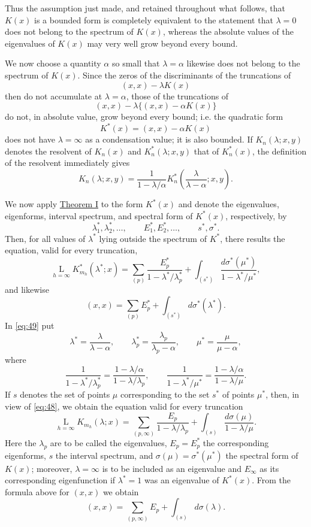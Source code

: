 \documentclass[b5paper,twoside]{article}
\newcommand{\originalpage}[1]{\phantomsection\label{origpage:#1}}
\begin{document}
Thus the assumption just made, and retained throughout what follows, that
$K(x)$ is a bounded form is completely equivalent to the statement that
$\lambda=0$ does not belong to the spectrum of $K(x)$, whereas the absolute
values of the eigenvalues of $K(x)$ may very well grow beyond every bound.

We now choose a quantity $\alpha$ so small that $\lambda=\alpha$ likewise
does not belong to the spectrum of $K(x)$.  Since the zeros of the
discriminants of the truncations of
\[
  (x,x)-\lambda K(x)
\]
then do not accumulate at $\lambda=\alpha$, those of the truncations of
\[
  (x,x)-\lambda\bigl\{(x,x)-\alpha K(x)\bigr\}
\]
do not, in absolute value, grow beyond every bound; i.e. the quadratic form
\[
  K^*(x)=(x,x)-\alpha K(x)
\]
does not have $\lambda=\infty$ as a condensation value; it is also bounded.
If $K_n(\lambda;x,y)$ denotes the resolvent of $K_n(x)$ and
$K_n^*(\lambda;x,y)$ that of $K_n^*(x)$, the definition of the resolvent
immediately gives
\begin{equation}
\tag{48}\label{eq:48}
  K_n(\lambda;x,y)
  =\frac{1}{1-\lambda/\alpha}
   K_n^*\!\left(\frac{\lambda}{\lambda-\alpha};x,y\right).
\end{equation}

We now apply \hyperref[thm:I]{Theorem I} to the form $K^*(x)$ and denote the
eigenvalues, eigenforms, interval spectrum, and spectral form of $K^*(x)$,
respectively, by
\[
  \lambda_1^*,\lambda_2^*,\ldots,
  \qquad E_1^*,E_2^*,\ldots,
  \qquad s^*,\sigma^*.
\]
Then, for all values of $\lambda^*$ lying outside the spectrum of $K^*$,
there results the equation, valid for every truncation,
\begin{equation}
\tag{49}\label{eq:49}
  \mathop{\mathrm{L}}\limits_{h=\infty}
  K_{m_h}^*(\lambda^*;x)
  =\sum_{(p)}\frac{E_p^*}{1-\lambda^*/\lambda_p^*}
   +\int_{(s^*)}\frac{d\sigma^*(\mu^*)}{1-\lambda^*/\mu^*},
\end{equation}
\originalpage{184}and likewise
\[
  (x,x)=\sum_{(p)}E_p^*+\int_{(s^*)}d\sigma^*(\lambda^*).
\]
In \eqref{eq:49} put
\[
  \lambda^*=\frac{\lambda}{\lambda-\alpha},
  \qquad
  \lambda_p^*=\frac{\lambda_p}{\lambda_p-\alpha},
  \qquad
  \mu^*=\frac{\mu}{\mu-\alpha},
\]
where
\[
  \frac{1}{1-\lambda^*/\lambda_p^*}
  =\frac{1-\lambda/\alpha}{1-\lambda/\lambda_p},
  \qquad
  \frac{1}{1-\lambda^*/\mu^*}
  =\frac{1-\lambda/\alpha}{1-\lambda/\mu}.
\]
If $s$ denotes the set of points $\mu$ corresponding to the set $s^*$ of
points $\mu^*$, then, in view of \eqref{eq:48}, we obtain the equation valid
for every truncation
\[
  \mathop{\mathrm{L}}\limits_{h=\infty}K_{m_h}(\lambda;x)
  =\sum_{(p,\infty)}\frac{E_p}{1-\lambda/\lambda_p}
   +\int_{(s)}\frac{d\sigma(\mu)}{1-\lambda/\mu}.
\]
Here the $\lambda_p$ are to be called the eigenvalues,
$E_p=E_p^*$ the corresponding eigenforms, $s$ the interval spectrum, and
$\sigma(\mu)=\sigma^*(\mu^*)$ the spectral form of $K(x)$; moreover,
$\lambda=\infty$ is to be included as an eigenvalue and $E_\infty$ as its
corresponding eigenfunction if $\lambda^*=1$ was an eigenvalue of $K^*(x)$.
From the formula above for $(x,x)$ we obtain
\begin{equation}
\tag{50}\label{eq:50}
  (x,x)=\sum_{(p,\infty)}E_p+\int_{(s)}d\sigma(\lambda).
\end{equation}
\end{document}
